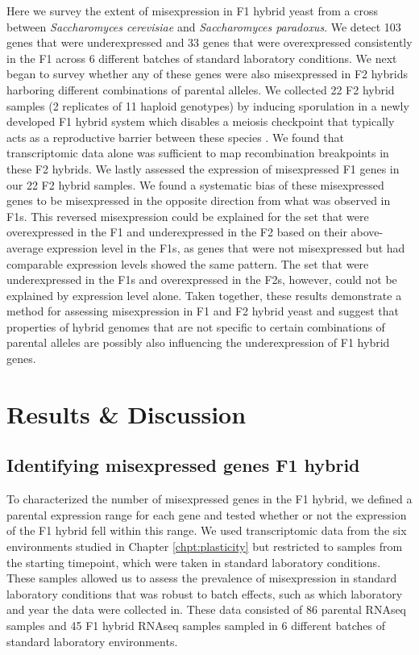 
Here we survey the extent of misexpression in F1 hybrid yeast from a cross between \textit{Saccharomyces cerevisiae} and \textit{Saccharomyces paradoxus}. We detect 103 genes that were underexpressed and 33 genes that were overexpressed consistently in the F1 across 6 different batches of standard laboratory conditions. We next began to survey whether any of these genes were also misexpressed in F2 hybrids harboring different combinations of parental alleles. We collected 22 F2 hybrid samples (2 replicates of 11 haploid genotypes) by inducing sporulation in a newly developed F1 hybrid system which disables a meiosis checkpoint that typically acts as a reproductive barrier between these species \cite{Bozdag2021}. We found that transcriptomic data alone was sufficient to map recombination breakpoints in these F2 hybrids. We lastly assessed the expression of misexpressed F1 genes in our 22 F2 hybrid samples. We found a systematic bias of these misexpressed genes to be misexpressed in the opposite direction from what was observed in F1s. This reversed misexpression could be explained for the set that were overexpressed in the F1 and underexpressed in the F2 based on their above-average expression level in the F1s, as genes that were not misexpressed but had comparable expression levels showed the same pattern. The set that were underexpressed in the F1s and overexpressed in the F2s, however, could not be explained by expression level alone. Taken together, these results demonstrate a method for assessing misexpression in F1 and F2 hybrid yeast and suggest that properties of hybrid genomes that are not specific to certain combinations of parental alleles are possibly also influencing the underexpression of F1 hybrid genes.

\section{Results \& Discussion}

\subsection{Identifying misexpressed genes F1 hybrid}

To characterized the number of misexpressed genes in the F1 hybrid, we defined a parental expression range for each gene and tested whether or not the expression of the F1 hybrid fell within this range. We used transcriptomic data from the six environments studied in Chapter \ref{chpt:plasticity} but restricted to samples from the starting timepoint, which were taken in standard laboratory conditions. These samples allowed us to assess the prevalence of misexpression in standard laboratory conditions that was robust to batch effects, such as which laboratory and year the data were collected in. These data consisted of 86 parental RNAseq samples and 45 F1 hybrid RNAseq samples sampled in 6 different batches of standard laboratory environments.

